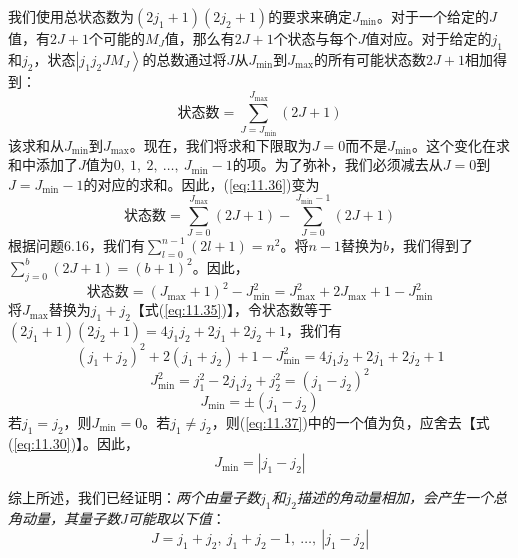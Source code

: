     我们使用总状态数为$\left(2j_1+1\right)\left(2j_2+1\right)$的要求来确定$J_{\min}$。对于一个给定的$J$值，有$2J+1$个可能的$M_J$值，那么有$2J+1$个状态与每个$J$值对应。对于给定的$j_1$和$j_2$，状态$\left| j_1 j_2 JM_J\right\rangle$的总数通过将$J$从$J_{\min}$到$J_{\max}$的所有可能状态数$2J+1$相加得到：
    \begin{equation}
        \text{状态数} = \sum_{J = J_{\min}}^{J_{\max}} \left(2J + 1\right)
        \label{eq:11.36}
    \end{equation}
    该求和从$J_{\min}$到$J_{\max}$。现在，我们将求和下限取为$J=0$而不是$J_{\min}$。这个变化在求和中添加了$J$值为$0,\:1,\:2,\:\ldots,\:J_{\min}-1$的项。为了弥补，我们必须减去从$J = 0$到$J = J_{\min} - 1$的对应的求和。因此，(\ref{eq:11.36})变为
    \begin{equation*}
        \text{状态数} = \sum_{J=0}^{J_{\max}} \left(2J + 1\right) - \sum_{J=0}^{J_{\min}-1} \left(2J + 1\right)
    \end{equation*}
    根据问题6.16，我们有$\sum_{l=0}^{n-1}\left(2l+1\right) = n^2$。将$n-1$替换为$b$，我们得到了$\sum_{j=0}^{b}\left(2J+1\right) = \left(b+1\right)^2$。因此，
    \begin{equation*}
        \text{状态数} = \left(J_{\max}+1\right)^{2}-J_{\min}^{2}=J_{\max}^{2}+2J_{\max}+1-J_{\min}^{2}
    \end{equation*}
    将$J_{\max}$替换为$j_1 + j_2$【式(\ref{eq:11.35})】，令状态数等于$\left(2j_1 + 1\right)\left(2j_2 + 1\right) = 4j_1j_2 + 2j_1 + 2j_2 + 1$，我们有
    \begin{equation*}
        \left(j_1 + j_2\right)^2 + 2\left(j_1 + j_2\right) + 1 - J_{\min}^2 = 4 j_1 j_2 + 2 j_1 + 2 j_2 + 1
    \end{equation*}
    \begin{equation*}
        J_{\min}^2 = j_1^2 - 2j_1j_2 + j_2^2 = \left(j_1 - j_2\right)^2
    \end{equation*}
    \begin{equation}
        J_{\min} = \pm \left(j_1 - j_2\right)
        \label{eq:11.37}
    \end{equation}
    若$j_1 = j_2$，则$J_{\min} = 0$。若$j_1 \neq j_2$，则(\ref{eq:11.37})中的一个值为负，应舍去【式(\ref{eq:11.30})】。因此，
    \begin{equation}
        J_{\min} = \left| j_1 - j_2 \right|
        \label{eq:11.38}
    \end{equation}

    综上所述，我们已经证明：\textit{两个由量子数$j_1$和$j_2$描述的角动量相加，会产生一个总角动量，其量子数$J$可能取以下值}：
    \begin{equation}
        \boxed{
            J = j_1 + j_2, \:j_1 + j_2 - 1, \:\ldots, \:\left|j_1 - j_2\right|
        }
        \label{eq:11.39}
    \end{equation}

